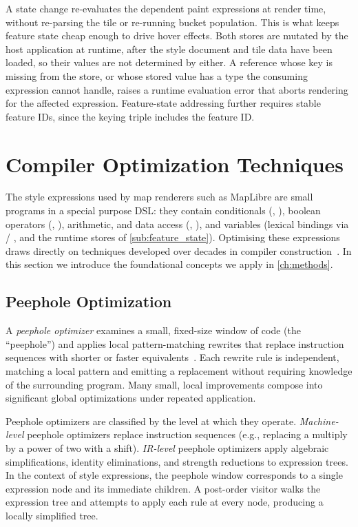 A state change re-evaluates the dependent paint expressions at render time, without re-parsing the tile or re-running bucket population.
This is what keeps feature state cheap enough to drive hover effects.
Both stores are mutated by the host application at runtime, after the style document and tile data have been loaded, so their values are not determined by either.
A reference whose key is missing from the store, or whose stored value has a type the consuming expression cannot handle, raises a runtime evaluation error that aborts rendering for the affected expression.
Feature-state addressing further requires stable feature IDs, since the keying triple includes the feature ID.

\section{Compiler Optimization Techniques}\label{sec:compiler_optimizations}

The style expressions used by map renderers such as MapLibre are small programs in a special purpose \ac{DSL}:
they contain conditionals (, ), boolean operators (, ), arithmetic, and data access (, ), and variables (lexical bindings via / , and the runtime stores of \cref{sub:feature_state}).
Optimising these expressions draws directly on techniques developed over decades in compiler construction~\cite{ahoCompilersPrinciplesTechniques2007}.
In this section we introduce the foundational concepts we apply in \cref{ch:methods}.

\subsection{Peephole Optimization}

\begin{sloppypar}
A \emph{peephole optimizer} examines a small, fixed-size window of code (the \enquote{peephole}) and applies local pattern-matching rewrites that replace instruction sequences with shorter or faster equivalents~\cite{davidsonCodeSelectionObject1984}.
Each rewrite rule is independent, matching a local pattern and emitting a replacement without requiring knowledge of the surrounding program.
Many small, local improvements compose into significant global optimizations under repeated application.
\end{sloppypar}

Peephole optimizers are classified by the level at which they operate.
\emph{Machine-level} peephole optimizers replace instruction sequences (e.g., replacing a multiply by a power of two with a shift).
\emph{\ac{IR}-level} peephole optimizers apply algebraic simplifications, identity eliminations, and strength reductions to expression trees.
In the context of style expressions, the peephole window corresponds to a single expression node and its immediate children.
A post-order visitor walks the expression tree and attempts to apply each rule at every node, producing a locally simplified tree.

